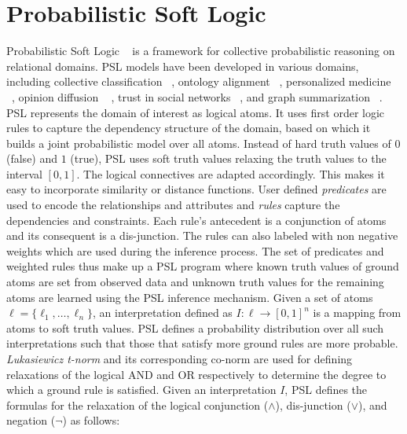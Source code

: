 \section{Probabilistic Soft Logic}
Probabilistic Soft Logic ~\cite{kimmig2012short} is a framework for collective probabilistic reasoning on relational domains.
PSL models have been developed in various domains, including collective classification ~\cite{broecheler2010computing}, ontology alignment ~\cite{brocheler2012probabilistic}, personalized medicine ~\cite{bach2010decision}, opinion diffusion ~\cite{bach2012scaling} , trust in social networks ~\cite{huang2012probabilistic}, and graph summarization ~\cite{memory2012graph}.
PSL represents the domain of interest as logical atoms.
It uses first order logic rules to capture the dependency structure of the domain, based on which it builds a joint probabilistic model over all atoms.
Instead of hard truth values of $0$ (false) and $1$ (true), PSL uses soft truth values relaxing the truth values to the interval $[0,1]$.
The logical connectives are adapted accordingly.
This makes it easy to incorporate similarity or distance functions.
\newline
User defined \emph{predicates} are used to encode the relationships and attributes and \emph{rules} capture the  dependencies and constraints.
Each rule's antecedent is a conjunction of atoms and its consequent is a dis-junction. 
The rules can also labeled with non negative weights which are used during the inference process. 
The set of predicates and weighted rules thus make up a PSL program where known truth values of ground atoms are set from observed data and unknown truth values for the remaining atoms are learned using the PSL inference mechanism.
\newline
Given a set of atoms 
$\ell = \{\ell_1,\ldots,\ell_n\}$,
an interpretation defined as 
$I : \ell \rightarrow [0,1]^n$
is a mapping from atoms to soft truth values.
PSL defines a probability distribution over all such interpretations such that those that satisfy more ground rules are more probable.
\emph{Lukasiewicz t-norm} and its corresponding co-norm are used for defining relaxations of the logical AND and OR respectively to determine the degree to which a ground rule is satisfied.
Given an interpretation $\mathit{I}$, PSL defines the formulas for the relaxation of the logical conjunction ($\wedge$), dis-junction ($\vee$), and negation ($\neg$) as follows:

